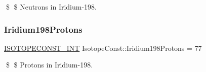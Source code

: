 \$ \$ Neutrons in Iridium-\/198. \mbox{\label{group___isotope_const-_iridium-_ir198_gae69c9450a295de99aa8605203f068554}} 
\subsubsection{\texorpdfstring{Iridium198\+Protons}{Iridium198Protons}}
{\footnotesize\ttfamily \mbox{\hyperlink{group___isotope_const-_macros_ga5f18360b3e99483a35c32d789e62621c}{I\+S\+O\+T\+O\+P\+E\+C\+O\+N\+S\+T\+\_\+\+I\+NT}} Isotope\+Const\+::\+Iridium198\+Protons = 77}

\$ \$ Protons in Iridium-\/198. 